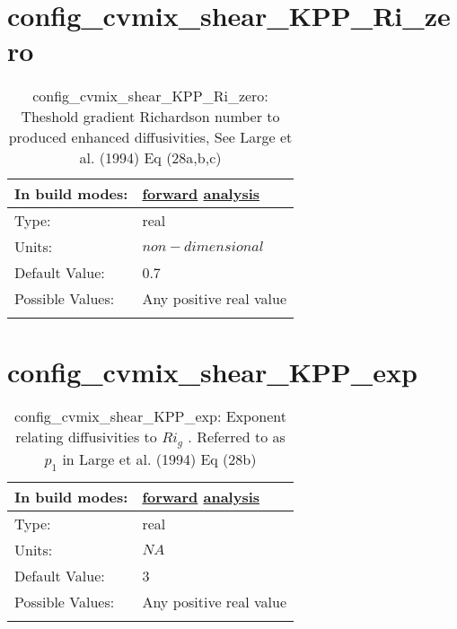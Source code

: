 \section[config\_cvmix\_shear\_KPP\_Ri\_zero]{config\_cvmix\_shear\_KPP\_Ri\_zero}
\label{sec:nm_sec_config_cvmix_shear_KPP_Ri_zero}
\begin{center}
\begin{longtable}{| p{2.0in} || p{4.0in} |}
    \hline
    In build modes: & \hyperref[subsec:forward_nm_tab_cvmix]{forward} \hyperref[subsec:analysis_nm_tab_cvmix]{analysis} \\
    \hline
    Type: & real \\
    \hline
    Units: & $non-dimensional$ \\
    \hline
    Default Value: & 0.7 \\
    \hline
    Possible Values: & Any positive real value \\
    \hline
    \caption{config\_cvmix\_shear\_KPP\_Ri\_zero: Theshold gradient Richardson number to produced enhanced diffusivities, See Large et al. (1994) Eq (28a,b,c)}
\end{longtable}
\end{center}
\section[config\_cvmix\_shear\_KPP\_exp]{config\_cvmix\_shear\_KPP\_exp}
\label{sec:nm_sec_config_cvmix_shear_KPP_exp}
\begin{center}
\begin{longtable}{| p{2.0in} || p{4.0in} |}
    \hline
    In build modes: & \hyperref[subsec:forward_nm_tab_cvmix]{forward} \hyperref[subsec:analysis_nm_tab_cvmix]{analysis} \\
    \hline
    Type: & real \\
    \hline
    Units: & $NA$ \\
    \hline
    Default Value: & 3 \\
    \hline
    Possible Values: & Any positive real value \\
    \hline
    \caption{config\_cvmix\_shear\_KPP\_exp:  Exponent relating diffusivities to  $Ri_g$ . Referred to as  $p_1$  in Large et al. (1994) Eq (28b)}
\end{longtable}
\end{center}
